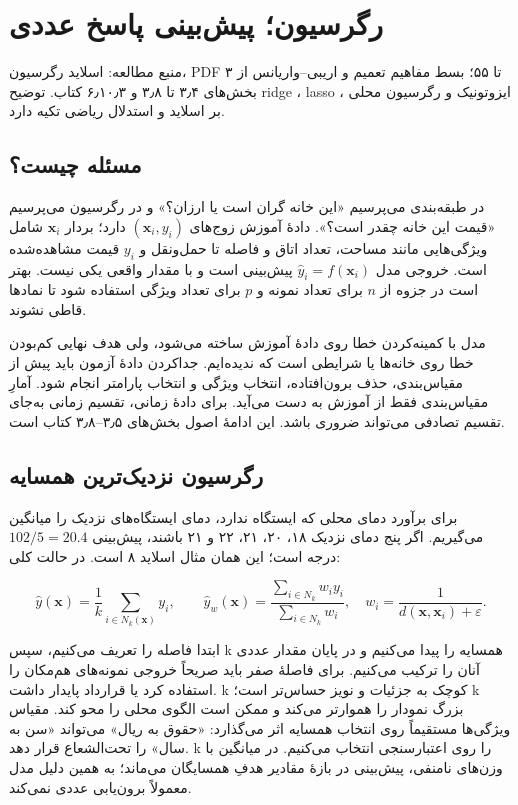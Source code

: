 \documentclass[12pt,a4paper,oneside]{report}
\newcounter{ex}[chapter]
\newcommand{\source}[1]{\par{\small\color{muted} منبع مطالعه: #1}\par}
\begin{document}
\chapter{رگرسیون؛ پیش‌بینی پاسخ عددی}
\source{اسلاید رگرسیون، PDF ۳ تا ۵۵؛ بسط مفاهیم تعمیم و اریبی–واریانس از بخش‌های ۳٫۴ تا ۳٫۸ و ۶٫۱۰٫۳ کتاب. توضیح ridge ، lasso ، ایزوتونیک و رگرسیون محلی بر اسلاید و استدلال ریاضی تکیه دارد.}
\section{مسئله چیست؟}

در طبقه‌بندی می‌پرسیم «این خانه گران است یا ارزان؟» و در رگرسیون می‌پرسیم «قیمت این خانه چقدر است؟». دادهٔ آموزش زوج‌های \((\boldsymbol{x}_i,y_i)\) دارد؛ بردار \(\boldsymbol{x}_i\) شامل ویژگی‌هایی مانند مساحت، تعداد اتاق و فاصله تا حمل‌ونقل و \(y_i\) قیمت مشاهده‌شده است. خروجی مدل \(\widehat y_i=f(\boldsymbol{x}_i)\) پیش‌بینی است و با مقدار واقعی یکی نیست. بهتر است در جزوه از \(n\) برای تعداد نمونه و \(p\) برای تعداد ویژگی استفاده شود تا نمادها قاطی نشوند.

مدل با کمینه‌کردن خطا روی دادهٔ آموزش ساخته می‌شود، ولی هدف نهایی کم‌بودن خطا روی خانه‌ها یا شرایطی است که ندیده‌ایم. جداکردن دادهٔ آزمون باید پیش از مقیاس‌بندی، حذف برون‌افتاده، انتخاب ویژگی و انتخاب پارامتر انجام شود. آمارِ مقیاس‌بندی فقط از آموزش به دست می‌آید. برای دادهٔ زمانی، تقسیم زمانی به‌جای تقسیم تصادفی می‌تواند ضروری باشد. این ادامهٔ اصول بخش‌های ۳٫۵--۳٫۸ کتاب است.

\section{رگرسیون نزدیک‌ترین همسایه}

برای برآورد دمای محلی که ایستگاه ندارد، دمای ایستگاه‌های نزدیک را میانگین می‌گیریم. اگر پنج دمای نزدیک ۱۸، ۲۰، ۲۱، ۲۲ و ۲۱ باشند، پیش‌بینی \(102/5=20.4\) درجه است؛ این همان مثال اسلاید ۸ است. در حالت کلی:

\[
\widehat y(\boldsymbol{x})=\frac1k\sum_{i\in N_k(\boldsymbol{x})}y_i,
\qquad
\widehat y_w(\boldsymbol{x})=\frac{\sum_{i\in N_k}w_i y_i}{\sum_{i\in N_k}w_i},
\quad w_i=\frac1{d(\boldsymbol{x},\boldsymbol{x}_i)+\varepsilon}.
\]

ابتدا فاصله را تعریف می‌کنیم، سپس k همسایه را پیدا می‌کنیم و در پایان مقدار عددی آنان را ترکیب می‌کنیم. برای فاصلهٔ صفر باید صریحاً خروجی نمونه‌های هم‌مکان را استفاده کرد یا قرارداد پایدار داشت. k کوچک به جزئیات و نویز حساس‌تر است؛ k بزرگ نمودار را هموارتر می‌کند و ممکن است الگوی محلی را محو کند. مقیاس ویژگی‌ها مستقیماً روی انتخاب همسایه اثر می‌گذارد: «حقوق به ریال» می‌تواند «سن به سال» را تحت‌الشعاع قرار دهد. k را روی اعتبارسنجی انتخاب می‌کنیم. در میانگین با وزن‌های نامنفی، پیش‌بینی در بازهٔ مقادیر هدفِ همسایگان می‌ماند؛ به همین دلیل مدل معمولاً برون‌یابی عددی نمی‌کند.
\end{document}
